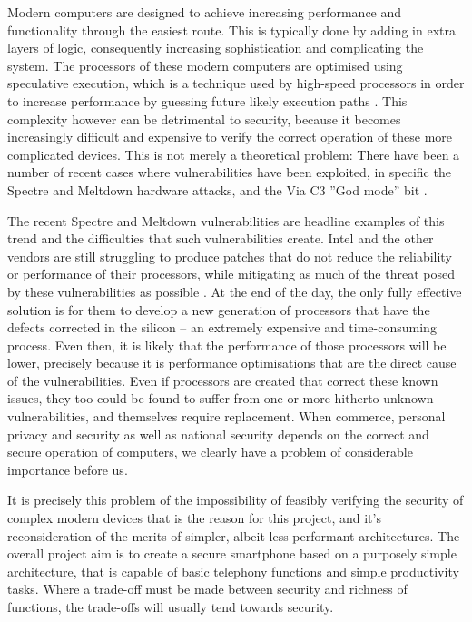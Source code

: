         Modern computers are designed to achieve increasing performance and functionality through the easiest route.
        This is typically done by adding in extra layers of logic, consequently increasing sophistication and complicating the system.
        The processors of these modern computers are optimised using speculative execution, which is a technique used by high-speed processors in order to increase performance by guessing future likely execution paths \cite{RN16}.
        This complexity however can be detrimental to security, because it becomes increasingly difficult and expensive to verify the correct operation of these more complicated devices.
        This is not merely a theoretical problem: There have been a number of recent cases where vulnerabilities have been exploited, in specific the Spectre and Meltdown hardware attacks, and the Via C3 ''God mode'' bit \cite{ViaC3x865:online}.

        The recent Spectre \cite{RN16} and Meltdown \cite{RN3} vulnerabilities are headline examples of this trend and the difficulties that such vulnerabilities create.
        Intel and the other vendors are still struggling to produce patches that do not reduce the reliability or performance of their processors, while mitigating as much of the threat posed by these vulnerabilities as possible \cite{Ifatfirs66:online}.
        At the end of the day, the only fully effective solution is for them to develop a new generation of processors that have the defects corrected in the silicon – an extremely expensive and time-consuming process.
        Even then, it is likely that the performance of those processors will be lower, precisely because it is performance optimisations that are the direct cause of the vulnerabilities.
        Even if processors are created that correct these known issues, they too could be found to suffer from one or more hitherto unknown vulnerabilities, and themselves require replacement.
        When commerce, personal privacy and security as well as national security depends on the correct and secure operation of computers, we clearly have a problem of considerable importance before us.

        It is precisely this problem of the impossibility of feasibly verifying the security of complex modern devices that is the reason for this project, and it's reconsideration of the merits of simpler, albeit less performant architectures.
The overall project aim is to create a secure smartphone based on a purposely simple architecture, that is capable of basic telephony functions and simple productivity tasks.
Where a trade-off must be made between security and richness of functions, the trade-offs will usually tend towards security.


